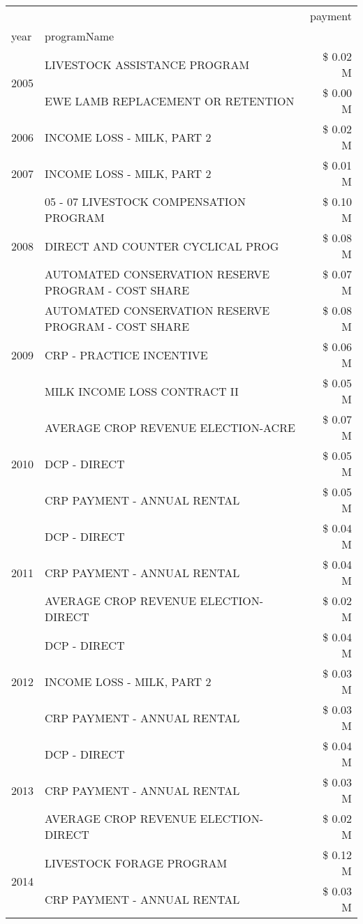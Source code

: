\begin{tabular}{llr}
\toprule
 &  & payment \\
year & programName &  \\
\midrule
\multirow[t]{2}{*}{2005} & LIVESTOCK ASSISTANCE PROGRAM & \$ 0.02 M \\
 & EWE LAMB REPLACEMENT OR RETENTION & \$ 0.00 M \\
\cline{1-3}
2006 & INCOME LOSS - MILK, PART 2 & \$ 0.02 M \\
\cline{1-3}
2007 & INCOME LOSS - MILK, PART 2 & \$ 0.01 M \\
\cline{1-3}
\multirow[t]{3}{*}{2008} & 05 - 07 LIVESTOCK COMPENSATION PROGRAM & \$ 0.10 M \\
 & DIRECT AND COUNTER CYCLICAL PROG & \$ 0.08 M \\
 & AUTOMATED CONSERVATION RESERVE PROGRAM - COST SHARE & \$ 0.07 M \\
\cline{1-3}
\multirow[t]{3}{*}{2009} & AUTOMATED CONSERVATION RESERVE PROGRAM - COST SHARE & \$ 0.08 M \\
 & CRP - PRACTICE INCENTIVE & \$ 0.06 M \\
 & MILK INCOME LOSS CONTRACT II & \$ 0.05 M \\
\cline{1-3}
\multirow[t]{3}{*}{2010} & AVERAGE CROP REVENUE ELECTION-ACRE & \$ 0.07 M \\
 & DCP - DIRECT & \$ 0.05 M \\
 & CRP PAYMENT - ANNUAL RENTAL & \$ 0.05 M \\
\cline{1-3}
\multirow[t]{3}{*}{2011} & DCP - DIRECT & \$ 0.04 M \\
 & CRP PAYMENT - ANNUAL RENTAL & \$ 0.04 M \\
 & AVERAGE CROP REVENUE ELECTION-DIRECT & \$ 0.02 M \\
\cline{1-3}
\multirow[t]{3}{*}{2012} & DCP - DIRECT & \$ 0.04 M \\
 & INCOME LOSS - MILK, PART 2 & \$ 0.03 M \\
 & CRP PAYMENT - ANNUAL RENTAL & \$ 0.03 M \\
\cline{1-3}
\multirow[t]{3}{*}{2013} & DCP - DIRECT & \$ 0.04 M \\
 & CRP PAYMENT - ANNUAL RENTAL & \$ 0.03 M \\
 & AVERAGE CROP REVENUE ELECTION-DIRECT & \$ 0.02 M \\
\cline{1-3}
\multirow[t]{3}{*}{2014} & LIVESTOCK FORAGE PROGRAM & \$ 0.12 M \\
 & CRP PAYMENT - ANNUAL RENTAL & \$ 0.03 M \\

\end{tabular}
